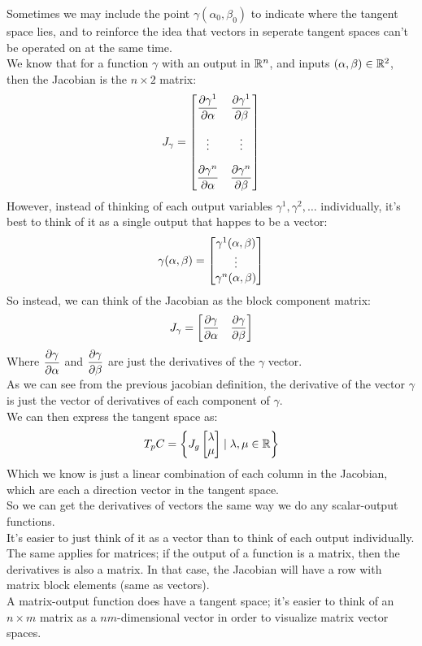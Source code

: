 \documentclass[12pt]{article}
\begin{document}
Sometimes we may include the point
$\gamma(\alpha_0, \beta_0)$ to indicate 
where the tangent space lies, and to reinforce
the idea that vectors in seperate tangent spaces
can't be operated on at the same time. \\

We know that for a function $\gamma$
with an output in $\mathbb{R}^n$,
and inputs $(\alpha, \beta) \in \mathbb{R}^2$,
then the Jacobian is the $n \times 2$ matrix:
\[ J_\gamma = \begin{bmatrix}
{\partialdd{\gamma^1}{\alpha}} & 
{\partialdd{\gamma^1}{\beta}} \vspace{10pt} \\
{\vdots} & {\vdots} \vspace{10pt} \\
{\partialdd{\gamma^n}{\alpha}} & 
{\partialdd{\gamma^n}{\beta}}
\end{bmatrix} \]
However, instead of thinking of each
output variables $\gamma^1, \gamma^2, \dots$
individually, it's best to think of it
as a single output that happes to be a vector:
\[ \gamma(\alpha, \beta) = 
\begin{bmatrix} \gamma^1(\alpha, \beta) \\ \vdots \\ \gamma^n (\alpha, \beta) \end{bmatrix} \]
So instead, we can think of the Jacobian
as the block component matrix:
\[ J_\gamma = \begin{bmatrix} \dfrac{\partial \gamma}{\partial \alpha} & \dfrac{\partial \gamma}{\partial \beta} \end{bmatrix} \]
Where $\dfrac{\partial \gamma}{\partial \alpha}$
and $\dfrac{\partial \gamma}{\partial \beta}$
are just the derivatives of the $\gamma$ vector. \\
As we can see from the previous jacobian definition,
the derivative of the vector $\gamma$
is just the vector of derivatives of each component
of $\gamma$. \\

We can then express the tangent space as:
\[ T_pC = \left\{  
J_g \begin{bmatrix} \lambda \\ \mu \end{bmatrix}
\mid \lambda, \mu \in \mathbb{R}  \right\} \]
Which we know is just a linear combination of each
column in the Jacobian, which are each
a direction vector in the tangent space. \\

So we can get the derivatives of vectors
the same way we do any scalar-output functions. \\
It's easier to just think of it as a vector
than to think of each output individually. \\

The same applies for matrices;
if the output of a function is a matrix,
then the derivatives is also a matrix. 
In that case, the Jacobian will have a row
with matrix block elements (same as vectors). \\
A matrix-output function does have a tangent space;
it's easier to think of an $n \times m$ matrix
as a $nm$-dimensional vector in order to visualize
matrix vector spaces. \\
\end{document}

